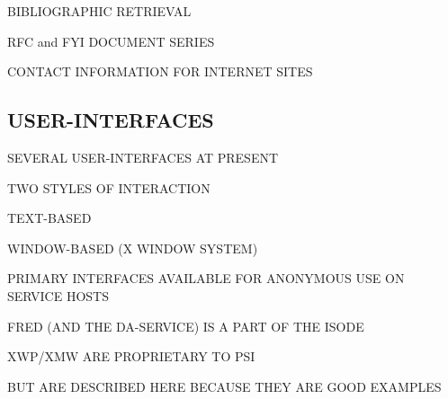 \begin{bwslide}

\vspace{6.0in}
\end{bwslide}




\begin{bwslide}

\begin{nrtc}
\item	BIBLIOGRAPHIC RETRIEVAL
    \begin{nrtc}
    \item	RFC and FYI DOCUMENT SERIES
    \end{nrtc}

\item	CONTACT INFORMATION FOR INTERNET SITES
\end{nrtc}
\end{bwslide}


\begin{bwslide}
\part*	{USER-INTERFACES}

\begin{nrtc}
\item	SEVERAL USER-INTERFACES AT PRESENT

\item	TWO STYLES OF INTERACTION
    \begin{nrtc}
    \item	TEXT-BASED

    \item	WINDOW-BASED (X WINDOW SYSTEM)
    \end{nrtc}

\item	PRIMARY INTERFACES AVAILABLE FOR ANONYMOUS USE ON SERVICE HOSTS

\item	FRED (AND THE DA-SERVICE) IS A PART OF THE ISODE

\item	XWP/XMW ARE PROPRIETARY TO PSI
    \begin{nrtc}
    \item	BUT ARE DESCRIBED HERE BECAUSE THEY ARE GOOD EXAMPLES
    \end{nrtc}
\end{nrtc}
\end{bwslide}


